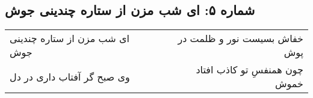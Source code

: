 \begin{center}
\section*{شماره ۵: ای شب مزن از ستاره چندینی جوش}
\label{sec:005}
\begin{longtable}{l p{0.5cm} r}
ای شب مزن از ستاره چندینی جوش
&&
خفاش بسیست نور و ظلمت در پوش
\\
وی صبح گر آفتاب داری در دل
&&
چون همنفسِ تو کاذب افتاد خموش
\\
\end{longtable}
\end{center}
